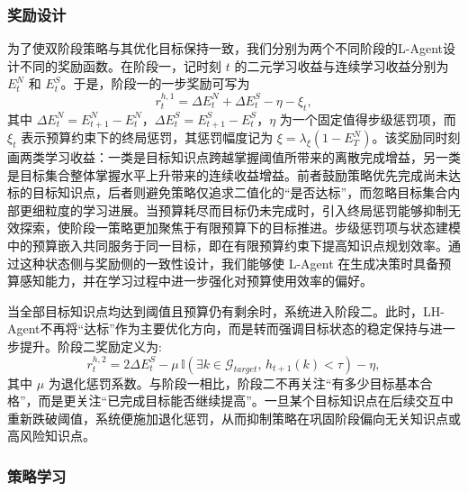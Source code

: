 \documentclass[11pt,a4paper]{article}
\begin{document}
\subsubsection{奖励设计}

为了使双阶段策略与其优化目标保持一致，我们分别为两个不同阶段的L-Agent设计不同的奖励函数。在阶段一，记时刻 $t$ 的二元学习收益与连续学习收益分别为 $E_t^{N}$ 和 $E_t^{S}$。于是，阶段一的一步奖励可写为
\begin{equation}
r_t^{h,1}
=
\Delta E_t^{N}
+
\Delta E_t^{S}
-
\eta
-
\xi_t,
\end{equation}
其中 $\Delta E_t^{N}=E_{t+1}^{N}-E_t^{N}$，$\Delta E_t^{S}=E_{t+1}^{S}-E_t^{S}$，$\eta$ 为一个固定值得步级惩罚项，而 $\xi_t$ 表示预算约束下的终局惩罚，其惩罚幅度记为 $\xi=\lambda_{\xi}(1-E_T^{N})$。该奖励同时刻画两类学习收益：一类是目标知识点跨越掌握阈值所带来的离散完成增益，另一类是目标集合整体掌握水平上升带来的连续收益增益。前者鼓励策略优先完成尚未达标的目标知识点，后者则避免策略仅追求二值化的“是否达标”，而忽略目标集合内部更细粒度的学习进展。当预算耗尽而目标仍未完成时，引入终局惩罚能够抑制无效探索，使阶段一策略更加聚焦于有限预算下的目标推进。步级惩罚项与状态建模中的预算嵌入共同服务于同一目标，即在有限预算约束下提高知识点规划效率。通过这种状态侧与奖励侧的一致性设计，我们能够使 L-Agent 在生成决策时具备预算感知能力，并在学习过程中进一步强化对预算使用效率的偏好。

当全部目标知识点均达到阈值且预算仍有剩余时，系统进入阶段二。此时，LH-Agent不再将“达标”作为主要优化方向，而是转而强调目标状态的稳定保持与进一步提升。阶段二奖励定义为:
\begin{equation}
r_t^{h,2}=2\Delta E_t^{S}-
\mu\,\mathbb{I}\!\left(\exists k\in\mathcal{G}_{target},\,h_{t+1}(k)<\tau\right)
-
\eta,
\end{equation}
其中 $\mu$ 为退化惩罚系数。与阶段一相比，阶段二不再关注“有多少目标基本合格”，而是更关注“已完成目标能否继续提高”。一旦某个目标知识点在后续交互中重新跌破阈值，系统便施加退化惩罚，从而抑制策略在巩固阶段偏向无关知识点或高风险知识点。

\subsubsection{策略学习}
\end{document}

